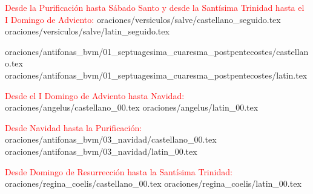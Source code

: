 \documentclass[10pt,twoside]{book}
\begin{document}
\begin{paracol}{2}
      \vspace{0.5em}
      
      \filacastellanolatinsincronota
            {\textcolor{red}{Desde la Purificación hasta Sábado Santo y desde la Santísima Trinidad hasta el I Domingo de Adviento:}}
            {oraciones/versiculos/salve/castellano_seguido.tex}
            {oraciones/versiculos/salve/latin_seguido.tex}

      \vspace{0.5em}

      \filacastellanolatinsincro
            {oraciones/antifonas_bvm/01_septuagesima_cuaresma_postpentecostes/castellano.tex}
            {oraciones/antifonas_bvm/01_septuagesima_cuaresma_postpentecostes/latin.tex}

      \vspace{0.5em}

      \filacastellanolatinsincronota
            {\textcolor{red}{Desde el I Domingo de Adviento hasta Navidad:}}
            {oraciones/angelus/castellano_00.tex}
            {oraciones/angelus/latin_00.tex}
      
      \vspace{0.5em}
      

      \vspace{0.5em}

      \filacastellanolatinsincronota
            {\textcolor{red}{Desde Navidad hasta la Purificación:}}
            {oraciones/antifonas_bvm/03_navidad/castellano_00.tex}
            {oraciones/antifonas_bvm/03_navidad/latin_00.tex}
      
      \vspace{0.5em}
      

      \vspace{0.5em}

      \filacastellanolatinsincronota
            {\textcolor{red}{Desde Domingo de Resurrección hasta la Santísima Trinidad:}}
            {oraciones/regina_coelis/castellano_00.tex}
            {oraciones/regina_coelis/latin_00.tex}
      
      \vspace{0.5em}
      

\end{paracol}
\end{document}

